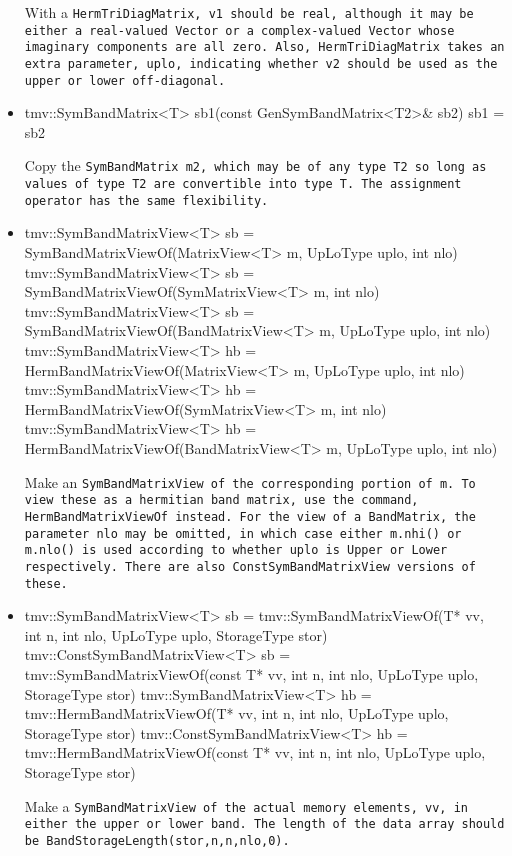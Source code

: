 \begin{itemize}
With a \tt{HermTriDiagMatrix}, \tt{v1} should be real, although
it may be either a real-valued \tt{Vector} or a complex-valued
\tt{Vector} whose imaginary components are all zero.
Also, \tt{HermTriDiagMatrix} takes an extra parameter, \tt{uplo}, indicating
whether \tt{v2} should be used as the upper or lower off-diagonal.

\item
\begin{tmvcode}
tmv::SymBandMatrix<T> sb1(const GenSymBandMatrix<T2>& sb2)
sb1 = sb2
\end{tmvcode}
Copy the \tt{SymBandMatrix m2}, which may be of any type \tt{T2} so long
as values of type \tt{T2} are convertible into type \tt{T}.
The assignment operator has the same flexibility.

\item
\begin{tmvcode}
tmv::SymBandMatrixView<T> sb = 
      SymBandMatrixViewOf(MatrixView<T> m, UpLoType uplo, int nlo)
tmv::SymBandMatrixView<T> sb = 
      SymBandMatrixViewOf(SymMatrixView<T> m, int nlo)
tmv::SymBandMatrixView<T> sb = 
      SymBandMatrixViewOf(BandMatrixView<T> m, UpLoType uplo, int nlo)
tmv::SymBandMatrixView<T> hb = 
      HermBandMatrixViewOf(MatrixView<T> m, UpLoType uplo, int nlo)
tmv::SymBandMatrixView<T> hb = 
      HermBandMatrixViewOf(SymMatrixView<T> m, int nlo)
tmv::SymBandMatrixView<T> hb = 
      HermBandMatrixViewOf(BandMatrixView<T> m, UpLoType uplo, int nlo)
\end{tmvcode}
Make an \tt{SymBandMatrixView} of the corresponding portion of \tt{m}.  
To view these as a hermitian band matrix, use the command,
\tt{HermBandMatrixViewOf} instead.
For the view of a \tt{BandMatrix}, the parameter \tt{nlo} may be 
omitted, in which case either \tt{m.nhi()} or \tt{m.nlo()} is used 
according to whether \tt{uplo} is \tt{Upper} or \tt{Lower} respectively.
There are also \tt{ConstSymBandMatrixView} versions of these.

\item
\begin{tmvcode}
tmv::SymBandMatrixView<T> sb = 
      tmv::SymBandMatrixViewOf(T* vv, int n, int nlo, 
          UpLoType uplo, StorageType stor)
tmv::ConstSymBandMatrixView<T> sb = 
      tmv::SymBandMatrixViewOf(const T* vv, int n, int nlo, 
          UpLoType uplo, StorageType stor)
tmv::SymBandMatrixView<T> hb = 
      tmv::HermBandMatrixViewOf(T* vv, int n, int nlo, 
          UpLoType uplo, StorageType stor)
tmv::ConstSymBandMatrixView<T> hb = 
      tmv::HermBandMatrixViewOf(const T* vv, int n, int nlo, 
          UpLoType uplo, StorageType stor)
\end{tmvcode}
Make a \tt{SymBandMatrixView} of the actual memory elements, \tt{vv}, in either the
upper or lower band.  The length of the data array should be 
\tt{BandStorageLength(stor,n,n,nlo,0)}.


\end{itemize}
